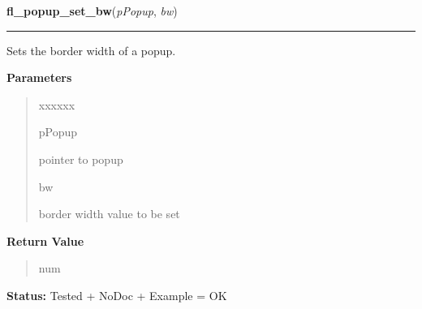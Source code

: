 \hspace{.8\funcindent}\begin{boxedminipage}{\funcwidth}

    \raggedright \textbf{fl\_popup\_set\_bw}(\textit{pPopup}, \textit{bw})

    \vspace{-1.5ex}

    \rule{\textwidth}{0.5\fboxrule}
\setlength{\parskip}{2ex}
    Sets the border width of a popup.

\setlength{\parskip}{1ex}
      \textbf{Parameters}
      \vspace{-1ex}

      \begin{quote}
        \begin{Ventry}{xxxxxx}

          \item[pPopup]

          pointer to popup

          \item[bw]

          border width value to be set

        \end{Ventry}

      \end{quote}

      \textbf{Return Value}
    \vspace{-1ex}

      \begin{quote}
      num

      \end{quote}

\textbf{Status:} Tested + NoDoc + Example = OK



    \end{boxedminipage}

    \label{xformslib:library:fl_popup_get_color}

    \vspace{0.5ex}

